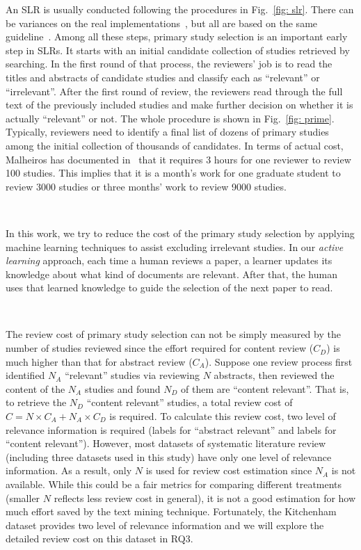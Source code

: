 \documentclass{svjour3}
\theoremstyle{break}
\newcommand{\respto}[1]{
\fcolorbox{black}{black!15}{
\label{response:#1}
\bf
  \scriptsize R-{#1}}~
}
\begin{document}
An SLR is usually conducted following the procedures in Fig.~\ref{fig: slr}. There can be variances on the real
implementations~\cite{wahono2015systematic,malhotra2015systematic,radjenovic2013software,unterkalmsteiner2012evaluation,hall2012systematic},
but all are based on the same guideline~\cite{keele2007guidelines}. Among all these steps, primary study selection is an important early step in SLRs. It starts with an initial candidate collection of studies retrieved by searching. In the first round of that process,
the reviewers' job is to read the titles and abstracts of candidate studies and classify each as ``relevant'' or ``irrelevant''. After the first round of review, the reviewers read through the full text of the previously included studies and make further decision on whether it is actually ``relevant'' or not. The whole procedure is shown in Fig.~\ref{fig: prime}. Typically, reviewers need to identify a final list of dozens of primary studies
among the initial collection of thousands of candidates. In terms of actual
cost, Malheiros has documented in~\cite{malheiros2007visual} that it requires 3
hours for one reviewer to review 100 studies.  This implies that it is a month's
work for one graduate student to review 3000 studies or three months' work to
review 9000 studies. 

\respto{2i}
In this work, we try to reduce the cost of the primary study selection by applying machine learning techniques to assist excluding irrelevant studies. In our {\em active learning} approach, each time a human reviews a paper, a learner updates its knowledge about what kind of documents are relevant. After that, the human uses that learned knowledge to guide the selection of the next paper to read.

\respto{3b1}
The review cost of primary study selection can not be simply measured by the number of studies reviewed since the effort required for content review ($C_D$) is much higher than that for abstract review ($C_A$). Suppose one review process first identified $N_A$ ``relevant'' studies via reviewing $N$ abstracts, then reviewed the content of the $N_A$ studies and found $N_D$ of them are ``content relevant''. That is, to retrieve the $N_D$ ``content relevant'' studies, a total review cost of $C=N\times C_A+N_A\times C_D$ is required. To calculate this review cost, two level of relevance information is required (labels for ``abstract relevant'' and labels for ``content relevant''). However, most datasets of systematic literature review (including three datasets used in this study) have only one level of relevance information. As a result, only $N$ is used for review cost estimation since $N_A$ is not available. While this could be a fair metrics for comparing different treatments (smaller $N$ reflects less review cost in general), it is not a good estimation for how much effort saved by the text mining technique. Fortunately, the Kitchenham dataset provides two level of relevance information and we will explore the detailed review cost on this dataset in RQ3.
\end{document}
